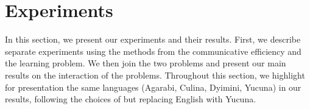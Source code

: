 \documentclass[11pt]{article}
\begin{document}













\section{Experiments}
\label{sec:experiments}

In this section, we present our experiments and their results. First, we describe separate experiments using the methods from the communicative efficiency and the learning problem. We then join the two problems and present our main results on the interaction of the problems. Throughout this section, we highlight for presentation the same languages (Agarabi, Culina, Dyimini, Yucuna) in our results, following the choices of \citet{zaslavsky2018efficient} but replacing English with Yucuna.
\end{document}
